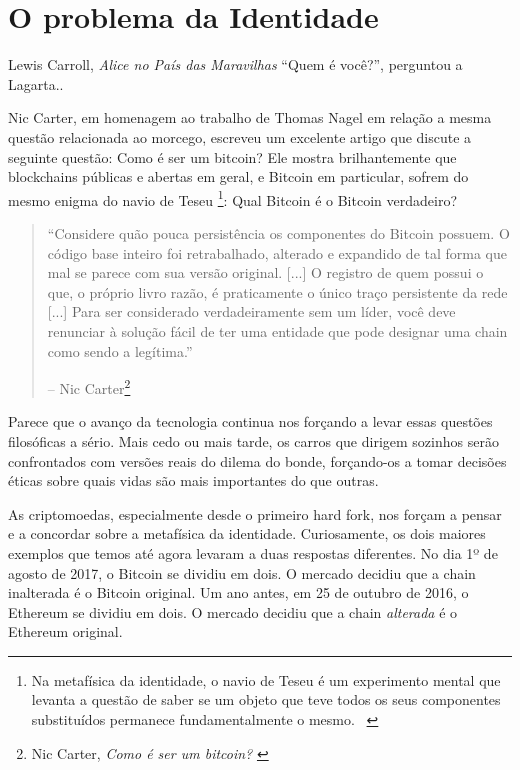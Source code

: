 \chapter{O problema da Identidade}
\label{les:4}

\begin{chapquote}{Lewis Carroll, \textit{Alice no País das Maravilhas}}
  \enquote{Quem é você?}, perguntou a Lagarta..
\end{chapquote}

Nic Carter, em homenagem ao trabalho de Thomas Nagel em relação a mesma questão relacionada ao morcego, escreveu um excelente artigo que discute a seguinte questão: Como é ser um bitcoin? Ele mostra brilhantemente que blockchains públicas e abertas em geral, e Bitcoin em particular, sofrem do mesmo enigma do navio de Teseu \footnote{Na metafísica da identidade, o navio de Teseu é um experimento mental que levanta a questão de saber se um objeto que teve todos os seus componentes substituídos permanece fundamentalmente o mesmo. ~\cite{wiki: theseus}}: Qual Bitcoin é o Bitcoin verdadeiro?

\begin{quotation}\begin{samepage}
\enquote{Considere quão pouca persistência os componentes do Bitcoin possuem. O código base inteiro foi retrabalhado, alterado e expandido de tal forma que mal se parece com sua versão original. [...] O registro de quem possui o que, o próprio livro razão, é praticamente o único traço persistente da rede [...] Para ser considerado verdadeiramente sem um líder, você deve renunciar à solução fácil de ter uma entidade que pode designar uma chain como sendo a legítima.}
\begin{flushright} -- Nic Carter\footnote{Nic Carter, \textit{Como é ser um bitcoin?} \cite{bitcoin-identity}}
\end{flushright}\end{samepage}\end{quotation}

Parece que o avanço da tecnologia continua nos forçando a levar essas questões filosóficas a sério. Mais cedo ou mais tarde, os carros que dirigem sozinhos serão confrontados com versões reais do dilema do bonde, forçando-os a tomar decisões éticas sobre quais vidas são mais importantes do que outras.

As criptomoedas, especialmente desde o primeiro hard fork, nos forçam a pensar e a concordar sobre a metafísica da identidade. Curiosamente, os dois maiores exemplos que temos até agora levaram a duas respostas diferentes. No dia 1º de agosto de 2017, o Bitcoin se dividiu em dois. O mercado decidiu que a chain inalterada é o Bitcoin original. Um ano antes, em 25 de outubro de 2016, o Ethereum se dividiu em dois. O mercado decidiu que a chain \textit{alterada} é o Ethereum original.

